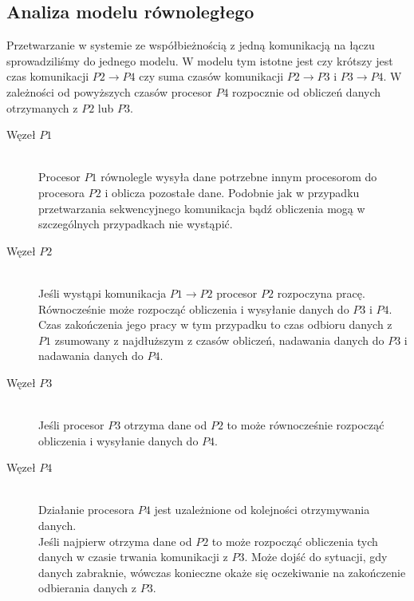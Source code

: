 \newpage

\subsection{Analiza modelu równoległego}

Przetwarzanie w systemie ze współbieżnością z jedną komunikacją na łączu sprowadziliśmy do jednego modelu.
W modelu tym istotne jest czy krótszy jest czas komunikacji $P2 \to P4$ czy suma czasów komunikacji $P2 \to P3$ i $P3 \to P4$.
W zależności od powyższych czasów procesor $P4$ rozpocznie od obliczeń danych otrzymanych z $P2$ lub $P3$.

\begin{description}

\item[Węzeł $P1$] \hfill \\

Procesor $P1$ równolegle wysyła dane potrzebne innym procesorom do procesora $P2$ i oblicza pozostałe dane.
Podobnie jak w przypadku przetwarzania sekwencyjnego komunikacja bądź obliczenia mogą w szczególnych przypadkach nie wystąpić.

\item[Węzeł $P2$] \hfill \\

Jeśli wystąpi komunikacja $P1 \to P2$ procesor $P2$ rozpoczyna pracę. Równocześnie może rozpocząć obliczenia i wysyłanie danych do $P3$ i $P4$.
Czas zakończenia jego pracy w tym przypadku to czas odbioru danych z $P1$ zsumowany z najdłuższym z czasów obliczeń, nadawania danych do $P3$ i nadawania danych do $P4$.

\item[Węzeł $P3$] \hfill \\

Jeśli procesor $P3$ otrzyma dane od $P2$ to może równocześnie rozpocząć obliczenia i wysyłanie danych do $P4$.

\item[Węzeł $P4$] \hfill \\

Działanie procesora $P4$ jest uzależnione od kolejności otrzymywania danych. \\

Jeśli najpierw otrzyma dane od $P2$ to może rozpocząć obliczenia tych danych w czasie trwania komunikacji z $P3$.
Może dojść do sytuacji, gdy danych zabraknie, wówczas konieczne okaże się oczekiwanie na zakończenie odbierania danych z $P3$. \\


\end{description}
